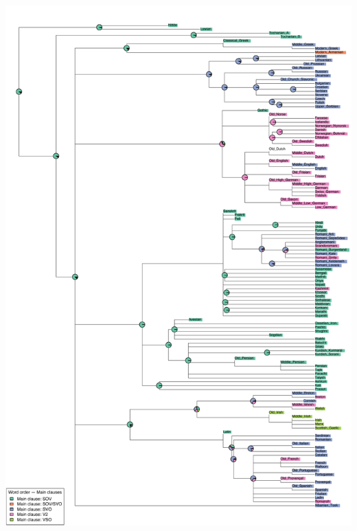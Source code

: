 \includegraphics[width=.9\linewidth]{supp-graphics/WordorderMainclausesSOVWordorderMainclausesSVOWordorderMainclausesV2WordorderMainclausesVSO.pdf}

